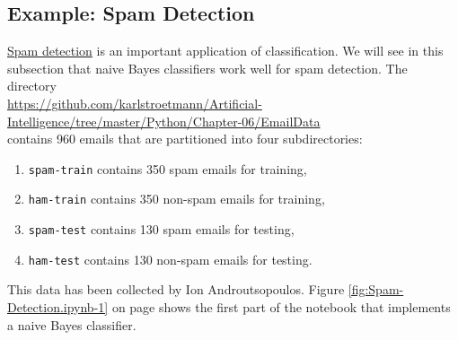 \subsection{Example: Spam Detection}
\href{https://en.wikipedia.org/wiki/Naive_Bayes_spam_filtering}{Spam detection} is an important application of classification.
We will see in this subsection that naive Bayes classifiers work well for spam detection.
The directory
\\[0.2cm]
\hspace*{-0.3cm}
\href{https://github.com/karlstroetmann/Artificial-Intelligence/tree/master/Python/Chapter-06/EmailData}{https://github.com/karlstroetmann/Artificial-Intelligence/tree/master/Python/Chapter-06/EmailData}
\\[0.2cm]
contains 960 emails that are partitioned into four subdirectories:
\begin{enumerate}
\item \texttt{spam-train} contains 350 spam emails for training,
\item \texttt{ham-train} contains 350 non-spam emails for training,
\item \texttt{spam-test} contains 130 spam emails for testing,
\item \texttt{ham-test} contains 130 non-spam emails for testing.
\end{enumerate}
This data has been collected by Ion Androutsopoulos.
Figure \ref{fig:Spam-Detection.ipynb-1} on page \pageref{fig:Spam-Detection.ipynb-1} shows the first part of the notebook that implements a naive Bayes classifier.

